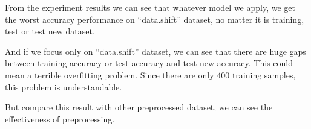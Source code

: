 \documentclass[a4paper]{article}
\begin{document}
From the experiment results we can see that whatever model we apply, we get the worst accuracy performance on ``data.shift'' dataset, no matter it is training, test or test new dataset.

And if we focus only on ``data.shift'' dataset, we can see that there are huge gaps between training accuracy or test accuracy and test new accuracy. This could mean a terrible overfitting problem. Since there are only $400$ training samples, this problem is understandable.

But compare this result with other preprocessed dataset, we can see the effectiveness of preprocessing.

% 
% 
% 
\end{document}

